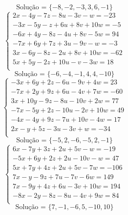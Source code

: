 \documentclass[12pt,oneside,a4paper]{article}
\begin{document}
\begin{equation*}
\text{Solução = }\{-8,-2,-3,3,6,-1\}
\end{equation*}
\vspace{\baselineskip}
\begin{equation*}
\begin{cases}
2x-4y-7z-8u-3v-w=-23 \\
-3x-5y-z+6u+8v+10w=-5 \\
-6x+4y-8z-4u+8v-5w=94 \\
-7x+6y+7z+3u-9v-w=-3 \\
3x-6y-8z-2u+8v+10w=-62 \\
5x+5y-2z+10u-v-3w=18 \\
\end{cases}
\end{equation*}
\begin{equation*}
\text{Solução = }\{-6,-4,-1,4,4,-10\}
\end{equation*}
\vspace{\baselineskip}
\begin{equation*}
\begin{cases}
-3x+6y+2z-6u-9v+4w=23 \\
-7x+2y+9z+6u-4v+7w=-60 \\
3x+10y-9z-8u-10v+2w=77 \\
-7x-5y+2z-10u-2v+10w=49 \\
-4x-4y+9z-7u+10v-4w=17 \\
2x-y+5z-3u-3v+w=-34 \\
\end{cases}
\end{equation*}
\begin{equation*}
\text{Solução = }\{-5,2,-6,-5,2,-1\}
\end{equation*}
\vspace{\baselineskip}
\begin{equation*}
\begin{cases}
6x-7y+3z+2u+5v-w=-19 \\
-5x+6y+2z+2u-10v-w=47 \\
5x+7y+4z+2u+5v-7w=-106 \\
7x-y-9z+7u-7v-6w=149 \\
7x-9y+4z+6u-3v+10w=194 \\
-8x-2y-8z-8u-4v+9w=84 \\
\end{cases}
\end{equation*}
\begin{equation*}
\text{Solução = }\{7,-1,-6,5,-10,10\}
\end{equation*}
\end{document}
